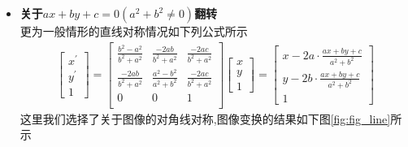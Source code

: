 \documentclass[UTF8,a4paper,10pt]{ctexart}
\begin{document}
\begin{flushleft}
\begin{itemize}
\begin{itemize}
\begin{figure}[htbp]
                \end{figure}
                \item \textbf{关于}$ax+by+c=0(a^{2}+b^{2}\neq{0})$\textbf{翻转}\\
                \hspace{2em}更为一般情形的直线对称情况如下列公式所示
                \begin{eqnarray}
                    \left[\begin{array}{c}
                        x^{\prime}\\
                        y^{\prime}\\
                        1
                    \end{array}\right]=\left[\begin{array}{ccc}
                        \frac{b^{2}-a^{2}}{b^{2}+a^{2}} & \frac{-2ab}{b^{2}+a^{2}} & \frac{-2ac}{b^{2}+a^{2}}\\
                        \frac{-2ab}{b^{2}+a^{2}} & \frac{a^{2}-b^{2}}{a^{2}+b^{2}} & \frac{-2ac}{b^{2}+a^{2}}\\
                        0 & 0 & 1\\
                    \end{array}\right]\left[\begin{array}{c}
                        x\\
                        y\\
                        1
                    \end{array}\right]=\left[\begin{array}{c}
                        x-2a\cdot\frac{ax+by+c}{a^{2}+b^{2}}\\
                        y-2b\cdot\frac{ax+by+c}{a^{2}+b^{2}}\\
                        1
                    \end{array}\right]\nonumber
                \end{eqnarray}
                这里我们选择了关于图像的对角线对称,图像变换的结果如下图\ref{fig:fig_line}所示
                \begin{figure}[htbp]
                    \centering
\end{figure}
\end{itemize}
\end{itemize}
\end{flushleft}
\end{document}
